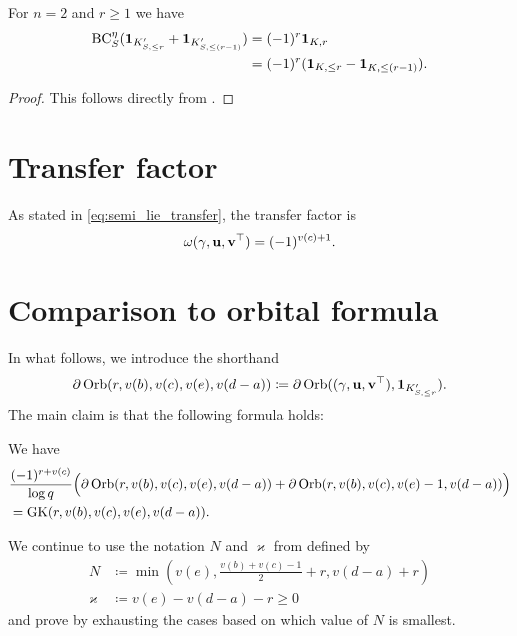 \begin{lemma}
  \label{lem:finale_base_change}
  For $n = 2$ and $r \ge 1$ we have
  \begin{align*}
    \operatorname{BC}_S^{\eta}(
      \mathbf{1}_{K'_{S, \le r}}
      + \mathbf{1}_{K'_{S, \le (r-1)}}
      )
      &= (-1)^r \mathbf{1}_{K, r} \\
      &= (-1)^r(\mathbf{1}_{K, \le r} - \mathbf{1}_{K, \le (r-1)}).
  \end{align*}
\end{lemma}
\begin{proof}
  This follows directly from \cite[Equation (7.1.9)]{ref:AFLspherical}.
\end{proof}

\section{Transfer factor}
As stated in \eqref{eq:semi_lie_transfer}, the transfer factor is
\[ \omega{(\gamma, \mathbf u, \mathbf v^\top)} = (-1)^{v(c)+1}. \]

\section{Comparison to orbital formula}
In what follows, we introduce the shorthand
\[ \partial\operatorname{Orb}(r, v(b), v(c), v(e), v(d-a))
  \coloneqq \partial \operatorname{Orb}({(\gamma, \mathbf u, \mathbf v^\top)}, \mathbf{1}_{K'_{S, \le r}}). \]
The main claim is that the following formula holds:
\begin{theorem}
  \label{thm:miracle}
  We have
  \begin{align*}
    &\frac{(-1)^{r+v(c)}}{\log q}\Big(\partial\operatorname{Orb}(r, v(b), v(c), v(e), v(d-a))
      + \partial\operatorname{Orb}(r, v(b), v(c), v(e)-1, v(d-a))\Big) \\
    &= \operatorname{GK}(r, v(b), v(c), v(e), v(d-a)).
  \end{align*}
\end{theorem}

We continue to use the notation $N$ and $\varkappa$ from  defined by
\begin{align*}
  N &\coloneqq \min \left( v(e),
    \tfrac{v(b)+v(c)-1}{2} + r, v(d-a) + r \right) \\
  \varkappa &\coloneqq v(e) - v(d-a) - r \ge 0
\end{align*}
and prove  by exhausting the
cases based on which value of $N$ is smallest.

